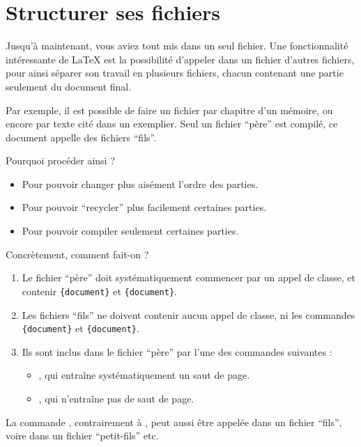 \section{Structurer ses fichiers}\label{inclusion}

Jusqu'à maintenant, vous aviez tout mis dans un seul fichier. Une fonctionnalité intéressante de \LaTeX{} est la possibilité d'appeler dans un fichier d'autres fichiers, pour ainsi séparer son travail en plusieurs fichiers, chacun contenant une partie seulement du document final.

Par exemple, il est possible de faire un fichier par chapitre d'un mémoire, ou encore  par texte cité dans un exemplier. Seul un fichier \enquote{père} est compilé, ce document appelle des fichiers \enquote{fils}.

Pourquoi procéder ainsi ?
\begin{itemize}
\item Pour pouvoir changer plus aisément l'ordre des parties. 
\item Pour pouvoir \enquote{recycler} plus facilement certaines parties.
\item Pour pouvoir compiler seulement certaines parties.
\end{itemize}

Concrètement, comment fait-on ?
\begin{enumerate}
\item Le fichier \enquote{père} doit systématiquement commencer par un appel de classe, et contenir \verb|{document}| et \verb|{document}|.
\item Les fichiers \enquote{fils} ne doivent contenir aucun appel de classe, ni les commandes \verb|{document}| et \verb|{document}|.
\item Ils sont inclus dans le fichier \enquote{père} par l'une des commandes suivantes :
\begin{itemize}
    \item {}, qui entraîne systématiquement un saut de page.
    \item {}, qui n'entraîne pas de saut de page.\label{input}
\end{itemize}
\end{enumerate}

La commande , contrairement à , peut aussi être  appelée dans un fichier \enquote{fils}, voire dans un fichier \enquote{petit-fils} etc.

